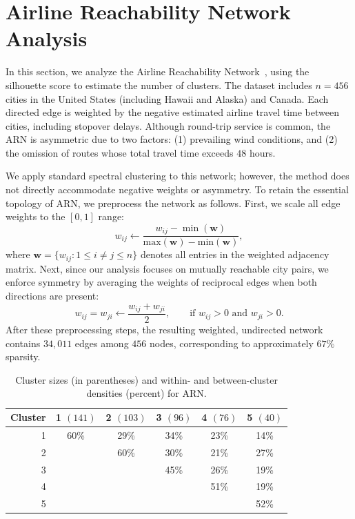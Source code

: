 \documentclass[12pt, titlepage, reqno]{article}
\begin{document}
\section{Airline Reachability Network Analysis}
\label{sec:air}


In this section, we analyze the Airline Reachability 
Network~\citep[ARN,][]{frey2007clustering}, using the silhouette 
score to estimate the number of clusters. The dataset includes $n = 
456$ cities in the United States (including Hawaii and Alaska) and 
Canada. Each directed edge is weighted by the negative estimated 
airline travel time between cities, including stopover delays. 
Although round-trip service is common, the ARN is asymmetric due to 
two factors: (1) prevailing wind conditions, and (2) the omission of 
routes whose total travel time exceeds $48$ hours.


We apply standard spectral clustering to this network; however, the 
method does not directly accommodate negative weights or asymmetry. 
To retain the essential topology of ARN, we preprocess the network as 
follows. First, we scale all edge weights to the $[0,1]$ range:
\[w_{ij} \leftarrow \frac{w_{ij} - 
\min(\bm{w})}{\text{max}(\bm{w})-\text{min}(\bm{w})},\]
where $\bm{w} = \{w_{ij}: 1 \le i \neq j \le n\}$ denotes all entries 
in the weighted adjacency matrix.
Next, since our analysis focuses on mutually reachable city pairs, we 
enforce symmetry by averaging the weights of reciprocal edges when 
both directions are present: \[w_{ij} = w_{ji} \leftarrow 
\frac{w_{ij} + w_{ji}}{2}, \qquad \text{if } w_{ij} > 0 \text{ and } 
w_{ji} > 0.\] 
After these preprocessing steps, the resulting weighted, undirected 
network contains $34{,}011$ edges among $456$ nodes, corresponding 
to approximately $67\%$ sparsity.


\begin{table}[tbh]
	\centering
	\small
	\renewcommand{\arraystretch}{1.2}
	\setlength{\tabcolsep}{12pt}
	\caption{Cluster sizes (in parentheses) and within- and 
		between-cluster densities (percent) for ARN.}
	\label{tab:real_cluster}
	\begin{tabular}{rccccc}
		\toprule
		Cluster & 1 $(141)$ & 2 $(103)$ & 3 $(96)$ & 4 $(76)$ & 5 
		$(40)$ \\ 
		\midrule
		1 & 60\% & 29\% & 34\% & 23\% & 14\% \\ 
		2 &  & 60\% & 30\% & 21\% & 27\% \\ 
		3 &  &  & 45\% & 26\% & 19\% \\ 
		4 &  &  &  & 51\% & 19\% \\ 
		5 &  &  &  &  & 52\% \\ 
		\bottomrule
	\end{tabular}
\end{table}
\end{document}
